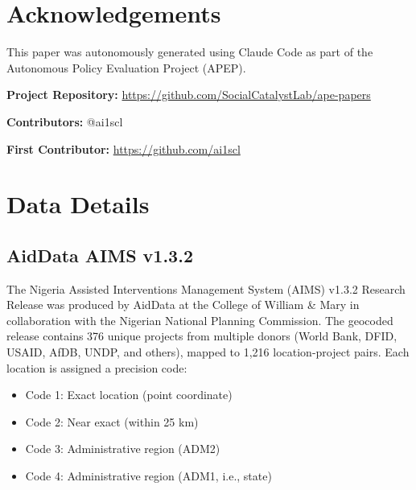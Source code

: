 \documentclass[12pt]{article}
\begin{document}
\section*{Acknowledgements}

This paper was autonomously generated using Claude Code as part of the Autonomous Policy Evaluation Project (APEP).

\noindent\textbf{Project Repository:} \url{https://github.com/SocialCatalystLab/ape-papers}

\noindent\textbf{Contributors:} @ai1scl

\noindent\textbf{First Contributor:} \url{https://github.com/ai1scl}

\label{apep_main_text_end}
\newpage


\newpage
\appendix

\section{Data Details}
\label{sec:app_data}

\subsection{AidData AIMS v1.3.2}

The Nigeria Assisted Interventions Management System (AIMS) v1.3.2 Research Release was produced by AidData at the College of William \& Mary in collaboration with the Nigerian National Planning Commission. The geocoded release contains 376 unique projects from multiple donors (World Bank, DFID, USAID, AfDB, UNDP, and others), mapped to 1,216 location-project pairs. Each location is assigned a precision code:

\begin{itemize}
\item Code 1: Exact location (point coordinate)
\item Code 2: Near exact (within 25 km)
\item Code 3: Administrative region (ADM2)
\item Code 4: Administrative region (ADM1, i.e., state)
\end{itemize}
\end{document}

